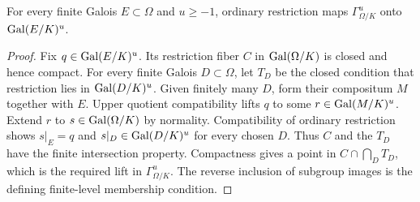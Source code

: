 \begin{lemma}
\label{fw:finite-upper-projections}
\leanok
For every finite Galois $E\subset\Omega$ and $u\geq-1$, ordinary
restriction maps $\Gamma_{\Omega/K}^u$ onto $\operatorname{Gal}(E/K)^u$.
\end{lemma}
\begin{proof}
Fix $q\in\operatorname{Gal}(E/K)^u$. Its restriction fiber $C$ in
$\operatorname{Gal}(\Omega/K)$ is closed and hence compact. For every finite Galois
$D\subset\Omega$, let $T_D$ be the closed condition that restriction
lies in $\operatorname{Gal}(D/K)^u$. Given finitely many $D$, form their compositum
$M$ together with $E$. Upper quotient compatibility lifts $q$ to some
$r\in\operatorname{Gal}(M/K)^u$. Extend $r$ to $s\in\operatorname{Gal}(\Omega/K)$ by normality.
Compatibility of ordinary restriction shows $s|_E=q$ and
$s|_D\in\operatorname{Gal}(D/K)^u$ for every chosen $D$. Thus $C$ and the $T_D$
have the finite intersection property. Compactness gives a point in
$C\cap\bigcap_D T_D$, which is the required lift in
$\Gamma_{\Omega/K}^u$. The reverse inclusion of subgroup images is
the defining finite-level membership condition.
\end{proof}

